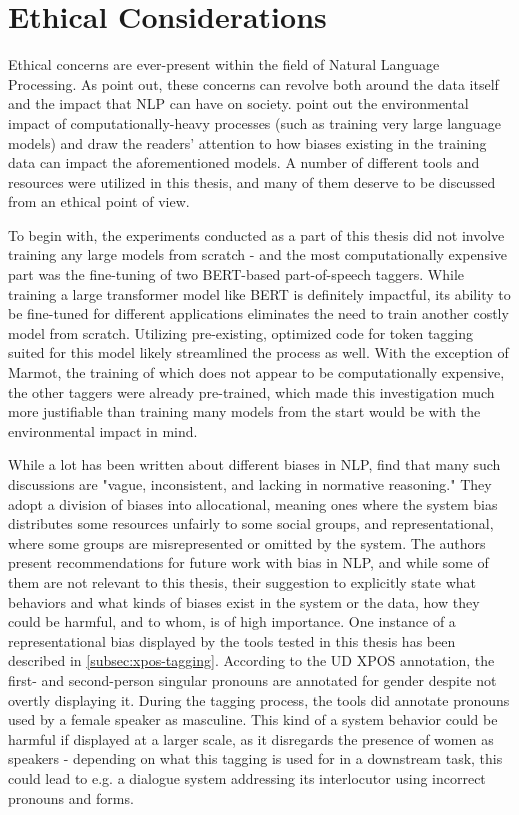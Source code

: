\section{Ethical Considerations}
\label{sec:ethicalcons}

Ethical concerns are ever-present within the field of Natural Language Processing. As \citet{hovy-spruit-2016-social} point out, these concerns can revolve both around the data itself and the impact that NLP can have on society. \citet{stochastic-parrots} point out the environmental impact of computationally-heavy processes (such as training very large language models) and draw the readers' attention to how biases existing in the training data can impact the aforementioned models. A number of different tools and resources were utilized in this thesis, and many of them deserve to be discussed from an ethical point of view.

To begin with, the experiments conducted as a part of this thesis did not involve training any large models from scratch - and the most computationally expensive part was the fine-tuning of two BERT-based part-of-speech taggers. While training a large transformer model like BERT is definitely impactful, its ability to be fine-tuned for different applications eliminates the need to train another costly model from scratch. Utilizing pre-existing, optimized code for token tagging suited for this model likely streamlined the process as well. With the exception of Marmot, the training of which does not appear to be computationally expensive, the other taggers were already pre-trained, which made this investigation much more justifiable than training many models from the start would be with the environmental impact in mind. 

While a lot has been written about different biases in NLP, \citet{blodgett-etal-2020-language} find that many such discussions are "vague, inconsistent, and lacking in normative reasoning." They adopt a division of biases into allocational, meaning ones where the system bias distributes some resources unfairly to some social groups, and representational, where some groups are misrepresented or omitted by the system. The authors present recommendations for future work with bias in NLP, and while some of them are not relevant to this thesis, their suggestion to explicitly state what behaviors and what kinds of biases exist in the system or the data, how they could be harmful, and to whom, is of high importance. One instance of a representational bias displayed by the tools tested in this thesis has been described in \autoref{subsec:xpos-tagging}. According to the UD XPOS annotation, the first- and second-person singular pronouns are annotated for gender despite not overtly displaying it. During the tagging process, the tools did annotate pronouns used by a female speaker as masculine. This kind of a system behavior could be harmful if displayed at a larger scale, as it disregards the presence of women as speakers - depending on what this tagging is used for in a downstream task, this could lead to e.g. a dialogue system addressing its interlocutor using incorrect pronouns and forms. 

